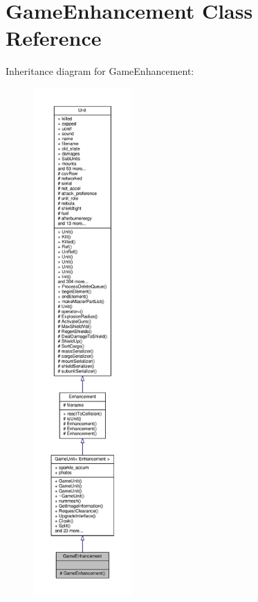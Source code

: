 \hypertarget{classGameEnhancement}{}\section{Game\+Enhancement Class Reference}
\label{classGameEnhancement}


Inheritance diagram for Game\+Enhancement\+:
\nopagebreak
\begin{figure}[H]
\begin{center}
\leavevmode
\includegraphics[height=550pt]{df/d4d/classGameEnhancement__inherit__graph}
\end{center}
\end{figure}


